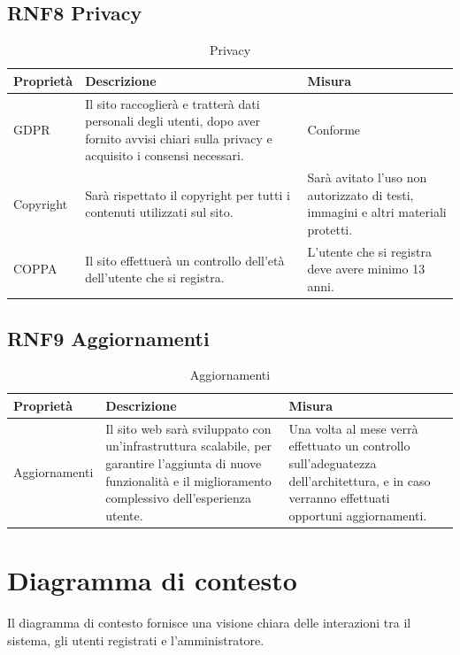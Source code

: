 \documentclass[a4paper,12pt]{article}
\begin{document}
\subsection*{RNF8 Privacy}
\begin{table}[H]
    \centering
    \begin{tabular}{|p{}|p{}|p{}|}
        \hline  
         Proprietà & Descrizione & Misura\\
         \hline      
         GDPR
         & Il sito raccoglierà e tratterà dati
        personali degli utenti, dopo aver fornito avvisi chiari sulla privacy e acquisito i consensi necessari.
         &Conforme\\ \hline
         Copyright
         & Sarà rispettato il copyright per tutti i contenuti utilizzati sul sito.
         &Sarà avitato l’uso non autorizzato di testi, immagini e altri materiali protetti.\\ \hline
         COPPA
         & Il sito effettuerà un controllo dell’età dell’utente che si registra.
         &L'utente che si registra deve avere minimo 13 anni.\\ \hline
    \end{tabular}
    \caption{Privacy}
\end{table}


\subsection*{RNF9 Aggiornamenti} 
\begin{table}[H]
    \centering
    \begin{tabular}{|p{}|p{}|p{}|}
        \hline  
         Proprietà & Descrizione & Misura\\
         \hline      
         Aggiornamenti
         & Il sito web sarà sviluppato con un'infrastruttura scalabile, per garantire l'aggiunta di nuove funzionalità e il miglioramento complessivo dell'esperienza utente.
         & Una volta al mese verrà effettuato un controllo sull'adeguatezza dell'architettura, e in caso verranno effettuati opportuni aggiornamenti.\\ \hline
    \end{tabular}
    \caption{Aggiornamenti}
\end{table}
 


\newpage

\section{Diagramma di contesto}
Il diagramma di contesto fornisce una visione chiara delle interazioni tra il sistema, gli utenti registrati e l'amministratore. 
\end{document}
